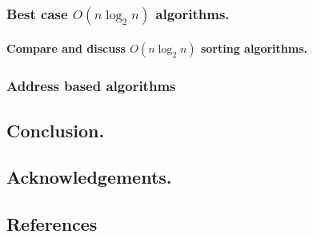 \documentclass{acm_proc_article-sp}
\begin{document}
\subsubsection{Best case $O(n \log_2 n)$ algorithms.}
\paragraph{Compare and discuss $O(n \log_2 n)$ sorting algorithms. }
\subsubsection{Address based algorithms}
\subsection{Conclusion.}
\subsection{Acknowledgements.}
\subsection{References}
\end{document}
